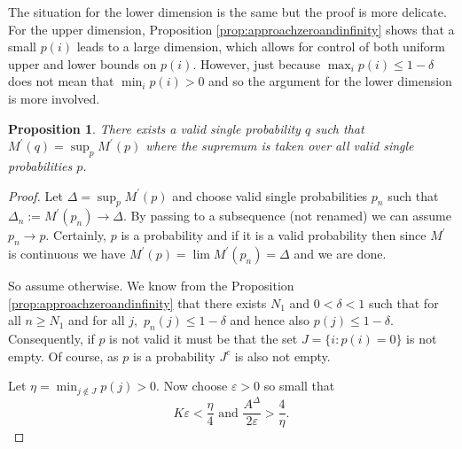 \documentclass{amsart}
\newtheorem{proposition}[theorem]{Proposition}
\theoremstyle{plain}
\numberwithin{equation}{section}
\begin{document}
The situation for the lower dimension is the same but the proof is more delicate.
For the upper dimension, Proposition \ref{prop:approachzeroandinfinity} shows that a small $p(i)$ leads to a large dimension, which allows for control of both uniform upper and lower bounds on $p(i)$.
However, just because $\max_i p(i) \le 1-\delta$ does not mean that $\min_i p(i) > 0$ and so the argument for the lower dimension is more involved.


\begin{proposition} \label{prop:max_single}
There exists a valid single probability $q$ such that 
$M^{\prime}(q)=\sup_{p}M^{\prime }(p)$ where the supremum is taken over all valid
single probabilities $p$.
\end{proposition}

\begin{proof}
Let $\Delta =\sup_{p}M^{\prime }(p)$ and choose valid single probabilities 
$p_{n}$ such that $\Delta _{n} := M^{\prime }(p_{n})\rightarrow \Delta$.
By passing to a subsequence (not renamed) we can assume $p_{n}\rightarrow p$.
Certainly, $p$ is a probability and if it is a valid probability then since $M^{\prime }$ 
is continuous we have $M^{\prime }(p)=\lim M^{\prime}(p_{n})=\Delta$ 
and we are done. 

So assume otherwise. 
We know from the Proposition \ref{prop:approachzeroandinfinity} that there exists $N_1$ and
$0<\delta <1$ such that for all $n\geq N_{1}$
and for all $j,$ $p_{n}(j)\leq 1-\delta $ and hence also $p(j)\leq 1-\delta$. 
Consequently, if $p$ is not valid it must be that the set $J=\{i:p(i)=0\}$ is not empty. 
Of course, as $p$ is a probability $J^{c}$ is also not empty.

Let $\eta =\min_{j\notin J}p(j)>0$. Now choose $\varepsilon >0$ so small
that 
\begin{equation*}
    K\varepsilon <\frac{\eta }{4}\text{ and }\frac{A^{\Delta }}{2\varepsilon }>\frac{4}{\eta }.
\end{equation*}


\end{proof}
\end{document}
